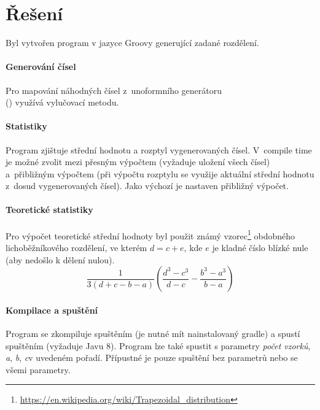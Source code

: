\documentclass[12pt, a4paper]{article}
\begin{document}
\section{Řešení}
Byl vytvořen program v jazyce Groovy generující zadané rozdělení.

\paragraph{Generování čísel}
Pro mapování náhodných čísel z~unoformního generátoru\\ () využívá vylučovací metodu.

\paragraph{Statistiky}
Program zjištuje střední hodnotu a rozptyl vygenerovaných čísel. V~compile time je možné zvolit mezi přesným výpočtem (vyžaduje uložení všech čísel) a~přibližným výpočtem (při výpočtu rozptylu se využije aktuální střední hodnotu z~dosud vygenerovaných čísel). Jako výchozí je nastaven přibližný výpočet.

\paragraph{Teoretické statistiky}
Pro výpočet teoretické střední hodnoty byl použit známý vzorec\footnote{\url{https://en.wikipedia.org/wiki/Trapezoidal\_distribution}} obdobného lichoběžníkového rozdělení, ve kterém $d = c + e$, kde $e$ je kladné číslo blízké nule (aby nedošlo k dělení nulou).
\begin{equation}
	\frac{1}{3(d+c-b-a)}\left(\frac{d^3-c^3}{d-c}-\frac{b^3-a^3}{b-a}\right)
\end{equation}

\paragraph{Kompilace a spuštění}
Program se zkompiluje spuštěním  (je nutné mít nainstalovaný gradle) a spustí spuštěním  (vyžaduje Javu 8).
Program lze také spustit s parametry \lt\emph{počet vzorků}, \emph{a}, \emph{b}, \emph{c}\gt \space v uvedeném pořadí.
Přípustné je pouze spuštění bez parametrů nebo se všemi parametry.
\end{document}

